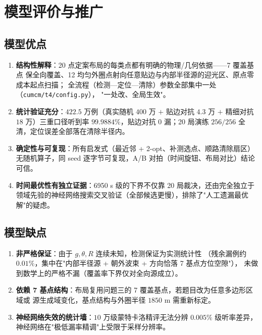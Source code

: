 \section{模型评价与推广}

\subsection{模型优点}

\begin{enumerate}
  \item \textbf{结构性解释}：20 点定案布局的每类点都有明确的物理/几何依据——7 覆盖基点
        保全向覆盖、12 均匀外圈点射向任意贴边与内部半径源的迎光区、原点零成本起点扫描；
        全流程（检测—定位—清除）参数全部集中一处（\texttt{cumcm/t4/config.py}），
        "一处改、全局生效"。
  \item \textbf{统计验证充分}：$422.5$ 万例（真实随机 $400$ 万 $+$ 贴边对抗 $4.3$ 万
        $+$ 精细对抗 $18$ 万）三重口径听到率 $99.9884\%$，贴边对抗 0 漏；20 局演练
        $256/256$ 全清，定位误差全部落在清除半径内。
  \item \textbf{确定性与可复现}：所有启发式（最近邻 + 2-opt、补测选点、顺路清除扇区）
        无随机算子，同 seed 逐字节可复现，A/B 对拍（时间旋钮、布局对比）结论可信。
  \item \textbf{时间最优性有独立证据}：6950 s 级的下界不仅靠 20 局裁决，还由完全独立于
        领域先验的神经网络搜索交叉验证（全部候选更慢），排除了"人工遗漏最优解"的疑虑。
\end{enumerate}

\subsection{模型缺点}

\begin{enumerate}
  \item \textbf{非严格保证}：由于 $g,\theta,R$ 连续未知，检测保证为实测统计性
        （残余漏例约 $0.01\%$，集中在"内部半径源 + 朝外波束 + 方向恰落 7 基点方位空隙"），
        未做到数学上的严格不漏（覆盖率下界仅对全向源成立）。
  \item \textbf{依赖 7 基点结构}：布局复用问题三的 7 覆盖基点，若题目改为任意多边形区域或
        源生成域变化，基点结构与外圈半径 $1850$ m 需重新标定。
  \item \textbf{神经网络失效的统计墙}：$10$ 万级蒙特卡洛精评无法分辨 $0.005\%$ 级听率差异，
        神经网络在"极低漏率精调"上受限于采样分辨率。
\end{enumerate}

